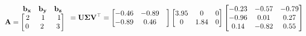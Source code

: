 \documentclass[preview]{standalone}
\begin{document}
\begin{align*}
\begin{array}{ccc}\begin{matrix}\hspace{0.75cm} \mathbf{b_{x}} &  \mathbf{b_{y}} &  \mathbf{b_{z}} \end{matrix} \\ \mathbf{A} = \begin{bmatrix} 2 & \hspace{0.1cm} 1 \hspace{0.1cm}& \hspace{0.1cm} 1 \\ \hspace{0.04cm}  0 \hspace{0.1cm} & \hspace{0.1cm} 2 \hspace{0.1cm}\hspace{0.1cm} & 3 \end{bmatrix} \end{array}= \mathbf{U \Sigma V^\top}= \begin{bmatrix} -0.46 & -0.89 & \\ -0.89 & 0.46 \end{bmatrix}\begin{bmatrix} 3.95 & 0 & 0 \\0 & 1.84 & 0 \end{bmatrix}\begin{bmatrix} -0.23 & -0.57 & -0.79 \\-0.96 & 0.01 & 0.27 \\ 0.14 & -0.82 & 0.55 \end{bmatrix}
\end{align*}
\end{document}
